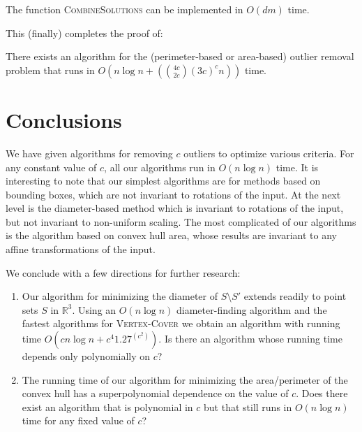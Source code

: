 \documentclass[lotsofwhite]{patmorin}
\newcommand{\runtime}{n\log n + \left({4c\choose 2c}(3c)^cn\right)}
\newcommand{\Oruntime}{O\left(\runtime\right)}
\begin{document}
\begin{lem}
The function \textsc{CombineSolutions} can be implemented in
$O(dm)$ time.
\end{lem}

This (finally) completes the proof of:
\begin{thm}
There exists an algorithm for the
(perimeter-based or area-based) outlier removal problem that runs in
$\Oruntime$ time.
\end{thm}

\section{Conclusions}

We have given algorithms for removing $c$ outliers to optimize various
criteria. For any constant value of $c$, all our algorithms run in
$O(n\log n)$ time.  It is interesting to note that our simplest
algorithms are for methods based on bounding boxes, which are not
invariant to rotations of the input.  At the next level is the
diameter-based method which is invariant to rotations of the input,
but not invariant to non-uniform scaling.  The most complicated of our
algorithms is the algorithm based on convex hull area, whose results
are invariant to any affine transformations of the input.

We conclude with a few directions for further research:

\begin{enumerate}

\item Our algorithm for minimizing the diameter of $S\setminus S'$
extends readily to point sets $S$ in $\mathbb{R}^3$.  Using an
$O(n\log n)$ diameter-finding algorithm \cite{cs88,r01} and the
fastest algorithms for \textsc{Vertex-Cover} \cite{ckj01} we obtain an
algorithm with running time $O(cn\log n + c^4 1.27^{(c^2)})$.  Is
there an algorithm whose running time depends only polynomially on
$c$?

\item The running time of our algorithm for minimizing the
area/perimeter of the convex hull has a superpolynomial dependence on the
value of $c$. Does there exist an algorithm
that is polynomial in $c$ but that still runs in $O(n\log n)$ time for
any fixed value of $c$?

\end{enumerate}



\end{document}
